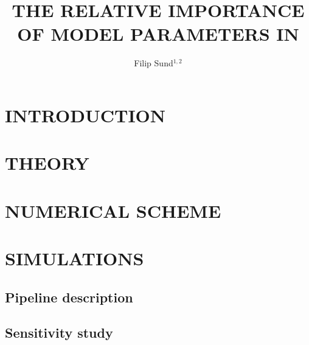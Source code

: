 \documentclass{mekit17}
\title{THE RELATIVE IMPORTANCE OF MODEL PARAMETERS IN \redtitle{TRANSIENT GAS-PIPELINE FLOW}}
\author{Filip Sund$^{1,2}$}
\begin{document}



\section{INTRODUCTION}


\section{THEORY}
\label{theory}


\section{NUMERICAL SCHEME}



\section{SIMULATIONS}
\label{simulations}
\subsection{Pipeline description}
\label{subsec:pipeline}

\subsection{Sensitivity study}

\end{document}
